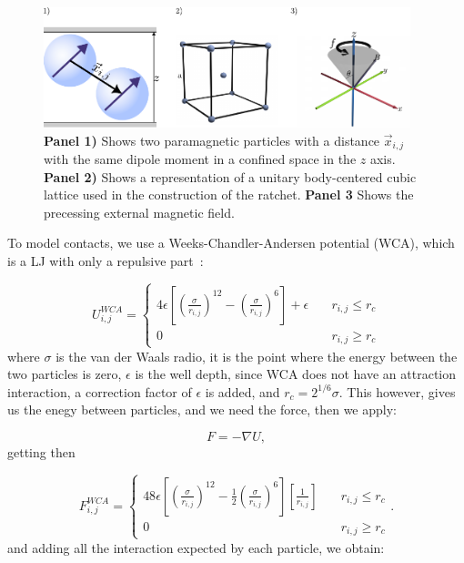\begin{figure}[H]
  \begin{center}
    \includegraphics[width=0.95\textwidth]{figures/methods1.pdf}
  \end{center}
  \caption[Representation of the paramagnetic colloids, body-centered-cubic lattice used for the ratchet, and the precessing conic magnetic field.]{\textbf{Panel 1)} Shows two paramagnetic particles with a distance \(\vec{x}_{i,j}\) with the same dipole moment in a confined space in the \( z\) axis. \textbf{Panel 2)} Shows a representation of a  unitary body-centered cubic lattice used in the construction of the ratchet. \textbf{Panel 3} Shows the precessing external magnetic field.}\label{fig:facecenteredlattice}
\end{figure}

To model contacts, we use a Weeks-Chandler-Andersen potential (WCA), which is a LJ with only a repulsive part~\cite{hess1999augmented}:

\begin{equation}
  U_{i,j}^{WCA} = \begin{cases} 
    4\epsilon\left[ \left( \frac{\sigma}{r_{i,j}}\right)^{12} - \left( \frac{\sigma}{r_{i,j}}\right)^6\right] + \epsilon \quad &r_{i,j} \leq r_c \\
    0 \quad & r_{i,j} \geq r_c
  \end{cases}
  \label{eq:wcapotential}
\end{equation}
where $\sigma$ is the van der Waals radio, it is the point where the energy between the two particles is zero, $\epsilon$ is the well depth, since WCA does not have an attraction interaction, a correction factor of $\epsilon$ is added, and $r_c = 2^{1/6}\sigma$. This however, gives us the enegy between particles, and we need the force, then we apply:

\begin{equation}
 F = - \nabla U, 
  \label{eq:negativegradient}
\end{equation}
getting then

\begin{equation}
  F_{i,j}^{WCA} = \begin{cases} 
    48\epsilon\left[ \left( \frac{\sigma}{r_{i,j}}\right)^{12} - \frac{1}{2}\left( \frac{\sigma}{r_{i,j}}\right)^6\right]\left[ \frac{1}{r_{i,j}}\right] \quad &r_{i,j} \leq r_c \\
    0 \quad & r_{i,j} \geq r_c
  \end{cases}.
  \label{eq:wcaforce}
\end{equation}
and adding all the interaction expected by each particle, we obtain:

